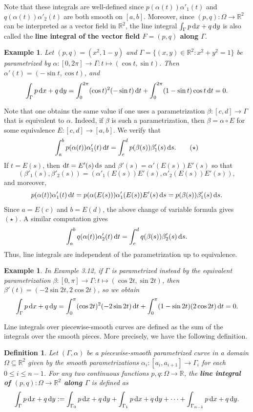 \documentclass[10pt]{article}
\newcommand{\R}{\mathbb{R}}
\theoremstyle{newstyle}
\newtheorem{defn}[thm]{Definition}
\newtheorem{exmp}[thm]{Example}
\begin{document}
Note that these integrals are well-defined since $p(\alpha(t))\alpha'_1(t)$ and $q(\alpha(t))
\alpha'_2(t)$ are both smooth on $[a, b]$. Moreover, since $(p, q) : \Omega \to \R^2$ can be 
interpreted as a vector field in $\R^2$, the line integral $\int_\Gamma p\,{\rm d}x + q\,{\rm d}y$
is also called the {\bf line integral of the vector field $F = (p, q)$ along $\Gamma$}.

\begin{exmp}
Let $(p, q) = (x^2, 1-y)$ and $\Gamma = \{(x, y) \in \R^2 : x^2 + y^2 = 1\}$ be parametrized 
by $\alpha : [0, 2\pi] \to \Gamma : t \mapsto (\cos t, \sin t)$. Then 
$\alpha'(t) = (-\sin t, \cos t)$, and 
\[ \int_\Gamma p\,{\rm d}x + q\,{\rm d}y = \int_0^{2\pi} (\cos t)^2 (-\sin t)\,{\rm d}t 
+ \int_0^{2\pi} (1-\sin t)\cos t\, {\rm d}t = 0. \]
\end{exmp}

Note that one obtains the same value if one uses a parametrization $\beta : [c, d] \to \Gamma$ 
that is equivalent to $\alpha$. Indeed, if $\beta$ is such a parametrization, then 
$\beta = \alpha \circ E$ for some equivalence $E : [c, d] \to [a, b]$. We verify that 
\[ \int_a^b p(\alpha(t)) \alpha'_1(t)\,{\rm d}t = \int_c^d p(\beta(s))\beta'_1(s)\,{\rm d}s. 
\tag{$\star$} \]
If $t = E(s)$, then ${\rm d}t = E'(s)\,{\rm d}s$ and $\beta'(s) = \alpha'(E(s)) E'(s)$ so that
\[ (\beta'_1(s), \beta'_2(s)) = (\alpha'_1(E(s))E'(s), \alpha'_2(E(s))E'(s)), \]
and moreover, 
\[ p(\alpha(t))\alpha'_1(t)\,{\rm d}t = p(\alpha(E(s))) \alpha'_1(E(s)) E'(s)\,{\rm d}s 
= p(\beta(s)) \beta'_1(s)\,{\rm d}s. \]
Since $a = E(c)$ and $b = E(d)$, the above change of variable formula gives $(\star)$. 
A similar computation gives 
\[ \int_a^b q(\alpha(t)) \alpha'_2(t)\,{\rm d}t = \int_c^d q(\beta(s)) \beta'_2(s)\,{\rm d}s. \]
Thus, line integrals are independent of the parametrization up to equivalence.

\begin{exmp}
In Example 3.12, if $\Gamma$ is parametrized instead by the equivalent parametrization 
$\beta : [0, \pi] \to \Gamma : t \mapsto (\cos 2t, \sin 2t)$, then 
$\beta'(t) = (-2\sin 2t, 2\cos 2t)$, so we obtain
\[ \int_\Gamma p\,{\rm d}x + q\,{\rm d}y = \int_0^\pi (\cos 2t)^2 (-2\sin2t)\,{\rm d}t 
+ \int_0^\pi (1-\sin2t)(2\cos2t)\,{\rm d}t = 0. \]
\end{exmp}
Line integrals over piecewise-smooth curves are defined as the sum of the integrals 
over the smooth pieces. More precisely, we have the following definition.

\begin{defn}
Let $(\Gamma, \alpha)$ be a piecewise-smooth parametrized curve in a domain $\Omega \subseteq \R^2$
given by the smooth parametrizations $\alpha_i : [a_i, a_{i+1}] \to \Gamma_i$ for each $0 \leq i \leq 
n-1$. For any two continuous functions $p, q : \Omega \to \R$, the {\bf line integral 
of $(p, q) : \Omega \to \R^2$ along $\Gamma$} is defined as
\[ \int_\Gamma p\,{\rm d}x + q\,{\rm d}y := \int_{\Gamma_0} p\,{\rm d}x + q\,{\rm d}y
+ \int_{\Gamma_1} p\,{\rm d}x + q\,{\rm d}y + \cdots + \int_{\Gamma_{n-1}} p\,{\rm d}x + q\,{\rm d}y. \]
\end{defn}
\end{document}
